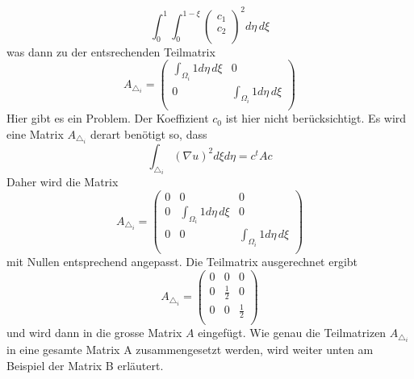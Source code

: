 \begin{equation}
			\int_0^1 \int_0^{1 - \xi} \left( \begin{array}{c} c_1 \\ c_2 \\	
\end{array} \right)^2 d\eta \, d\xi
			\label{fem:Minimal2LinAlgA}
\end{equation}
was dann zu der entsrechenden Teilmatrix
\begin{equation}
	A_{\triangle_i} = \left( \begin{array}{cc}
	\int_{\Omega_i} 1 d\eta \, d\xi & 0  \\ 
	0 & \int_{\Omega_i} 1 d\eta \, d\xi  \\
	\end{array}\right)
	\label{fem:TeilmatrixA}
\end{equation}
Hier gibt es ein Problem.
Der Koeffizient $c_0$ ist hier nicht berücksichtigt.
Es wird eine Matrix $A_{\triangle_i}$ derart benötigt so, dass
 \begin{equation}
	\int_{\triangle_i} (\nabla u)^2 d\xi d\eta = c^tAc
	\label{fem:KeiAhnig}
\end{equation}
Daher wird die Matrix
\begin{equation}
	A_{\triangle_i} = \left( \begin{array}{ccc}
	0 & 0 & 0 \\
	0 &  \int_{\Omega_i} 1 d\eta \, d\xi & 0  \\ 
	0 & 0 & \int_{\Omega_i} 1 d\eta \, d\xi  \\
	\end{array}\right)
	\label{fem:TeilmatrixA}
\end{equation}
mit Nullen entsprechend angepasst.
Die Teilmatrix ausgerechnet ergibt
\begin{equation}
	A_{\triangle_i} = \left( \begin{array}{ccc}
	0 & 0 & 0 \\
	0 & \frac{1}{2} & 0  \\ 
	0 & 0 &  \frac{1}{2}\\
	\end{array}\right)
\end{equation}
und wird dann in die grosse Matrix $A$ eingefügt.
Wie genau die Teilmatrizen $A_{\triangle_i}$ in eine gesamte Matrix
A zusammengesetzt werden, wird weiter unten am Beispiel der Matrix
B erläutert.

